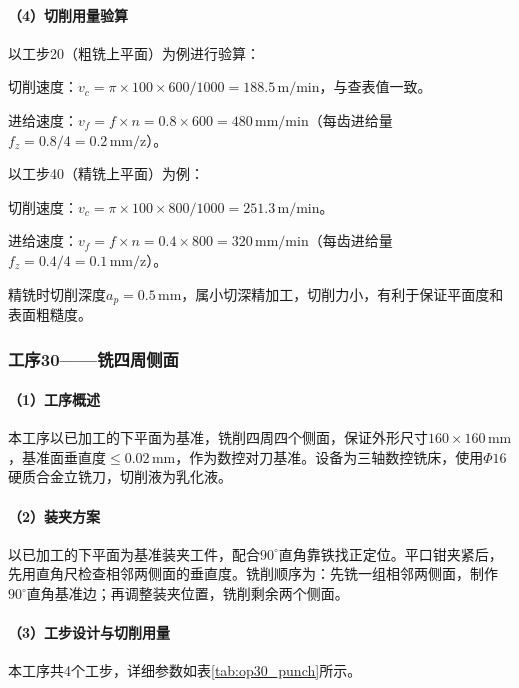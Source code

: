 \documentclass{xautCADreport}
\begin{document}
\paragraph{（4）切削用量验算}

以工步20（粗铣上平面）为例进行验算：

切削速度：$v_c = \pi \times 100 \times 600 / 1000 = 188.5\,\mathrm{m/min}$，与查表值一致。

进给速度：$v_f = f \times n = 0.8 \times 600 = 480\,\mathrm{mm/min}$（每齿进给量$f_z = 0.8/4 = 0.2\,\mathrm{mm/z}$）。

以工步40（精铣上平面）为例：

切削速度：$v_c = \pi \times 100 \times 800 / 1000 = 251.3\,\mathrm{m/min}$。

进给速度：$v_f = f \times n = 0.4 \times 800 = 320\,\mathrm{mm/min}$（每齿进给量$f_z = 0.4/4 = 0.1\,\mathrm{mm/z}$）。

精铣时切削深度$a_p=0.5\,\mathrm{mm}$，属小切深精加工，切削力小，有利于保证平面度和表面粗糙度。

\subsubsection{工序30——铣四周侧面}

\paragraph{（1）工序概述}

本工序以已加工的下平面为基准，铣削四周四个侧面，保证外形尺寸$160\times160\,\mathrm{mm}$，基准面垂直度$\leq0.02\,\mathrm{mm}$，作为数控对刀基准。设备为三轴数控铣床，使用$\Phi16$硬质合金立铣刀，切削液为乳化液。

\paragraph{（2）装夹方案}

以已加工的下平面为基准装夹工件，配合$90^{\circ}$直角靠铁找正定位。平口钳夹紧后，先用直角尺检查相邻两侧面的垂直度。铣削顺序为：先铣一组相邻两侧面，制作$90^{\circ}$直角基准边；再调整装夹位置，铣削剩余两个侧面。

\paragraph{（3）工步设计与切削用量}

本工序共4个工步，详细参数如表\ref{tab:op30_punch}所示。
\end{document}
